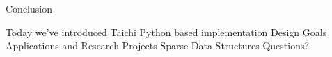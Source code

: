\begin{frame}{Conclusion}
  \begin{outline}
  \1 Today we've introduced Taichi
  \2 Python based implementation
  \2 Design Goals
  \2 Applications and Research Projects
  \2 Sparse Data Structures
  \1 Questions?
  \end{outline}
\end{frame}

